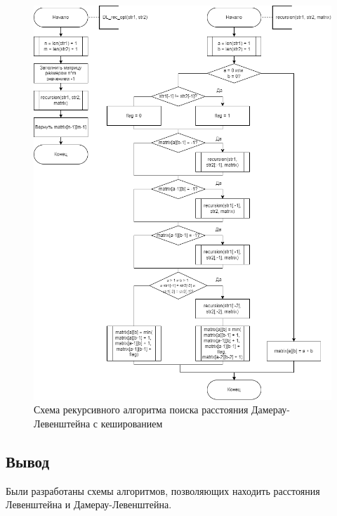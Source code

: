 \begin{figure}[h!btp]
    \captionsetup{justification=centering}
	\centering
	\includegraphics[width=450pt]{inc/dl-rec-opt.png}
	\caption{Схема рекурсивного алгоритма поиска расстояния Дамерау-Левенштейна с кешированием}
	\label{fig:dl-rec-opt}	
\end{figure}
\clearpage


\subsection*{Вывод}

Были разработаны схемы алгоритмов, позволяющих находить расстояния Левенштейна и Дамерау-Левенштейна. 